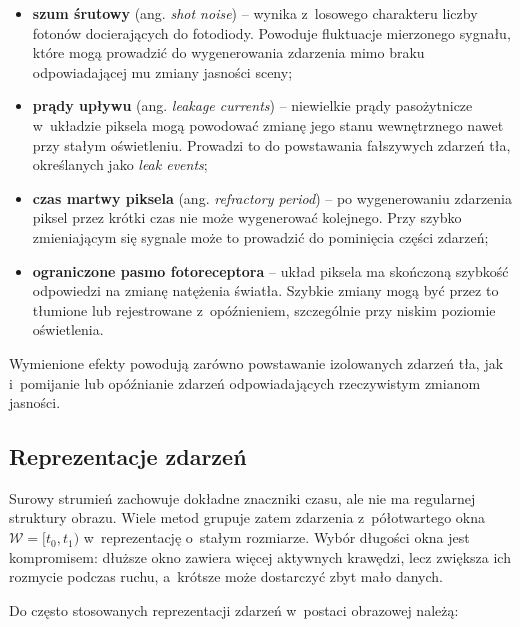 \begin{itemize}
    \item \textbf{szum śrutowy} (ang. \textit{shot noise}) -- wynika z~losowego
    charakteru liczby fotonów docierających do fotodiody. Powoduje fluktuacje
    mierzonego sygnału, które mogą prowadzić do wygenerowania zdarzenia mimo
    braku odpowiadającej mu zmiany jasności sceny;

    \item \textbf{prądy upływu} (ang. \textit{leakage currents}) -- niewielkie
    prądy pasożytnicze w~układzie piksela mogą powodować zmianę jego stanu
    wewnętrznego nawet przy stałym oświetleniu. Prowadzi to do powstawania
    fałszywych zdarzeń tła, określanych jako \textit{leak events};

    \item \textbf{czas martwy piksela} (ang. \textit{refractory period}) --
    po wygenerowaniu zdarzenia piksel przez krótki czas nie może wygenerować
    kolejnego. Przy szybko zmieniającym się sygnale może to prowadzić do
    pominięcia części zdarzeń;

    \item \textbf{ograniczone pasmo fotoreceptora} -- układ piksela ma
    skończoną szybkość odpowiedzi na zmianę natężenia światła. Szybkie zmiany
    mogą być przez to tłumione lub rejestrowane z~opóźnieniem, szczególnie
    przy niskim poziomie oświetlenia.
\end{itemize}

Wymienione efekty powodują zarówno powstawanie izolowanych zdarzeń tła,
jak i~pomijanie lub opóźnianie zdarzeń odpowiadających rzeczywistym zmianom
jasności.


\subsection{Reprezentacje zdarzeń}
\label{subsec:reprezentacje_zdarzen}

Surowy strumień zachowuje dokładne znaczniki czasu, ale nie ma regularnej struktury obrazu. Wiele metod grupuje zatem zdarzenia z~półotwartego okna $\mathcal{W}=[t_0,t_1)$ w~reprezentację o~stałym rozmiarze. Wybór długości okna jest kompromisem: dłuższe okno zawiera więcej aktywnych krawędzi, lecz zwiększa ich rozmycie podczas ruchu, a~krótsze może dostarczyć zbyt mało danych.

Do często stosowanych reprezentacji zdarzeń w~postaci obrazowej należą:

